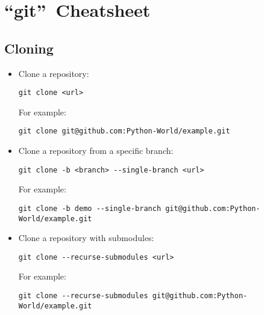 \section{\textquotedblleft git\textquotedblright\ Cheatsheet}


\subsection{Cloning}

\begin{itemize}
    \item Clone a repository:
    \begin{verbatim}
git clone <url>  
    \end{verbatim}
    For example:
    \begin{verbatim}
git clone git@github.com:Python-World/example.git
    \end{verbatim}
    \item Clone a repository from a specific branch:
    \begin{verbatim}
git clone -b <branch> --single-branch <url>  
    \end{verbatim}
    For example:
    \begin{verbatim}
git clone -b demo --single-branch git@github.com:Python-World/example.git
    \end{verbatim}
    \item Clone a repository with submodules:
    \begin{verbatim}
git clone --recurse-submodules <url>  
    \end{verbatim}
    For example:
    \begin{verbatim}
git clone --recurse-submodules git@github.com:Python-World/example.git
    \end{verbatim}
\end{itemize}


